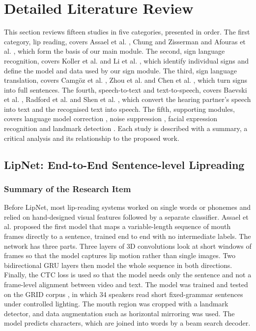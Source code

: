 \documentclass{FastFyp}
\begin{document}
\section{Detailed Literature Review}
\label{sec:lit-detailed}
This section reviews fifteen studies in five categories, presented in order. The first category, lip reading, covers Assael et al. \cite{assael2016lipnet}, Chung and Zisserman \cite{ref:Chung:2016} and Afouras et al. \cite{ref:Afouras:2018}, which form the basis of our main module. The second, sign language recognition, covers Koller et al. \cite{koller2016deepsign} and Li et al. \cite{ref:Li:2020}, which identify individual signs and define the model and data used by our sign module. The third, sign language translation, covers Camg\"oz et al. \cite{ref:Camgoz:2018}, Zhou et al. \cite{ref:ZhouB:2023} and Chen et al. \cite{ref:Chen:2026}, which turn signs into full sentences. The fourth, speech-to-text and text-to-speech, covers Baevski et al. \cite{baevski2020wav2vec}, Radford et al. \cite{radford2023whisper} and Shen et al. \cite{shen2018tacotron2}, which convert the hearing partner's speech into text and the recognised text into speech. The fifth, supporting modules, covers language model correction \cite{ma2025llmasr}, noise suppression \cite{valin2018hybrid}, facial expression recognition \cite{savchenko2022hsemotion} and landmark detection \cite{lugaresi2019mediapipe}. Each study is described with a summary, a critical analysis and its relationship to the proposed work.

\subsection{LipNet: End-to-End Sentence-level Lipreading}
\subsubsection*{Summary of the Research Item}
Before LipNet, most lip-reading systems worked on single words or phonemes and relied on hand-designed visual features followed by a separate classifier. Assael et al. \cite{assael2016lipnet} proposed the first model that maps a variable-length sequence of mouth frames directly to a sentence, trained end to end with no intermediate labels. The network has three parts. Three layers of 3D convolutions look at short windows of frames so that the model captures lip motion rather than single images. Two bidirectional GRU layers then model the whole sequence in both directions. Finally, the CTC loss is used so that the model needs only the sentence and not a frame-level alignment between video and text. The model was trained and tested on the GRID corpus \cite{cooke2006grid}, in which 34 speakers read short fixed-grammar sentences under controlled lighting. The mouth region was cropped with a landmark detector, and data augmentation such as horizontal mirroring was used. The model predicts characters, which are joined into words by a beam search decoder.
\end{document}
